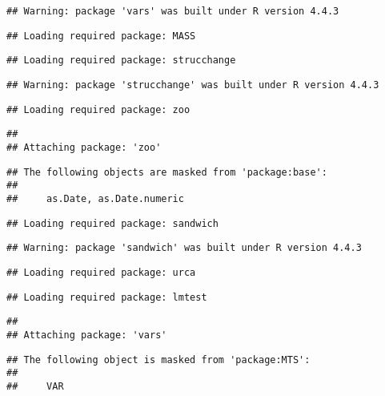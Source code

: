 \documentclass[
]{article}
\begin{document}
\begin{verbatim}
## Warning: package 'vars' was built under R version 4.4.3
\end{verbatim}

\begin{verbatim}
## Loading required package: MASS
\end{verbatim}

\begin{verbatim}
## Loading required package: strucchange
\end{verbatim}

\begin{verbatim}
## Warning: package 'strucchange' was built under R version 4.4.3
\end{verbatim}

\begin{verbatim}
## Loading required package: zoo
\end{verbatim}

\begin{verbatim}
## 
## Attaching package: 'zoo'
\end{verbatim}

\begin{verbatim}
## The following objects are masked from 'package:base':
## 
##     as.Date, as.Date.numeric
\end{verbatim}

\begin{verbatim}
## Loading required package: sandwich
\end{verbatim}

\begin{verbatim}
## Warning: package 'sandwich' was built under R version 4.4.3
\end{verbatim}

\begin{verbatim}
## Loading required package: urca
\end{verbatim}

\begin{verbatim}
## Loading required package: lmtest
\end{verbatim}

\begin{verbatim}
## 
## Attaching package: 'vars'
\end{verbatim}

\begin{verbatim}
## The following object is masked from 'package:MTS':
## 
##     VAR
\end{verbatim}
\end{document}
